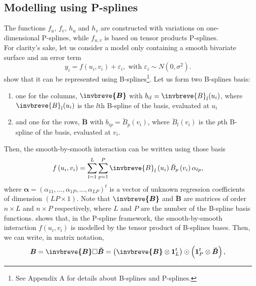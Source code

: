 \subsection{Modelling using P-splines}
The functions $f_u$, $f_v$, $h_u$ and $h_v$ are constructed  with variations on one-dimensional P-splines, while $f_{u,v}$ is based on tensor products P-splines.\\
For clarity's sake, let us consider a model only containing a smooth bivariate surface and an error term
\begin{equation}
    y _ { i } = f \left( u _ { i } , v _ { i } \right) + \varepsilon _ { i } , \text { with } \varepsilon _ { i } \sim N \left( 0 , \sigma ^ { 2 } \right) \text{.}
\label{eq:smooth_part_only_model}
\end{equation}
\textcite{lee_efficient_2013} show that it can be represented using B-splines\footnote{See Appendix A for details about B-splines and P-splines.}. Let us form two B-splines basis:
\begin{enumerate}
\item one for the columns, $\boldsymbol{\invbreve{B}}$ with $ b_{il}= \invbreve{B}_l(u_i)$, where $\invbreve{B}_l(u_i)$ is the $l$th B-spline of the basis, evaluated at $u_i$
\item and one for the rows, $\boldsymbol{\breve{B}}$ with $ b_{ip}= \breve{B}_p(v_i)$, where $\breve{B}_l(v_i)$ is the $p$th B-spline of the basis, evaluated at $v_i$.
\end{enumerate}
Then, the smooth-by-smooth interaction can be written using those basis
\begin{equation}
f \left( u _ { i } , v _ { i } \right) = \sum _ { l = 1 } ^ { L } \sum _ { p = 1 } ^ { P } \invbreve { B } _ { l } \left( u _ { i } \right) \breve { B } _ { p } \left( v _ { i } \right) \alpha _ { l p }  \text{,}
\end{equation}
where $\boldsymbol{\alpha} = (\alpha_{11},\ldots,\alpha_{1P},\ldots,\alpha_{LP})^t$ is a vector of unknown regression coefficients of dimension $(LP \times 1)$. Note that $\boldsymbol{\invbreve{B}}$ and $\boldsymbol{\breve{B}}$ are matrices of order $n \times L$ and $n\times P$ respectively, where $L$ and $P$ are the number of the B-spline basis functions. \textcite{dierckx_curve_1995} shows that, in the P-spline framework, the smooth-by-smooth interaction $f(u_i,v_i)$ is modelled by the tensor product of B-splines bases. Then, we can write, in matrix notation,
\begin{equation}
    \boldsymbol{B} = \boldsymbol{\invbreve{B}} \square \boldsymbol{\breve{B}} = \left( \boldsymbol{\invbreve{ B }} \otimes \boldsymbol{1} _ { L } ^ { t } \right) \odot \left( \mathbf { 1 } _ { P } ^ { t } \otimes \boldsymbol{\breve{B}} \right) \text{,}
\end{equation}

